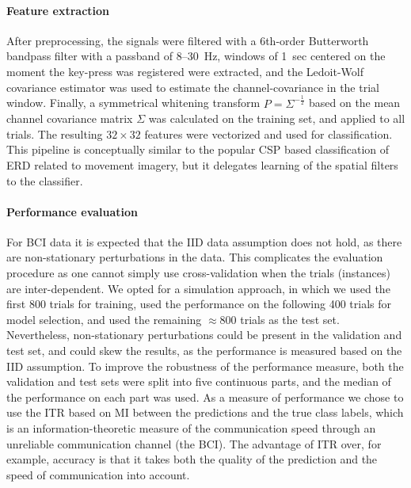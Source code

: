 \paragraph{Feature extraction}
After preprocessing, the signals were filtered with a 6th-order Butterworth
bandpass filter with a passband of 8--30~Hz, windows of 1~sec centered on the
moment the key-press was registered were extracted, and the Ledoit-Wolf
covariance estimator \cite{ledoit2004wce} was used to estimate the
channel-covariance in the trial window. Finally, a symmetrical whitening
transform $P = \Sigma^{-\frac{1}{2}}$ based on the mean channel covariance
matrix $\Sigma$ was calculated on the training set, and applied to all trials.
The resulting $32\times32$ features were vectorized and used for
classification. This pipeline is conceptually similar to the popular \ac{CSP}
based \cite{koles1991qet, ramoser2000osf} classification of \ac{ERD} related to
movement imagery, but it delegates learning of the spatial filters to the
classifier. 

\paragraph{Performance evaluation}
For \ac{BCI} data it is expected that the \ac{IID} data assumption does not
hold, as there are non-stationary perturbations in the data. This complicates
the evaluation procedure as one cannot simply use cross-validation when the
trials (instances) are inter-dependent. We opted for a simulation
approach, in which we used the first 800 trials for training, used the
performance on the following 400 trials for model selection, and used the
remaining $\approx 800$ trials as the test set. Nevertheless, non-stationary
perturbations could be present in the validation and test set, and could skew
the results, as the performance is measured based on the \ac{IID} assumption.
To improve the robustness of the performance measure, both the validation and
test sets were split into five continuous parts, and the median of the
performance on each part was used.
%
As a measure of performance we chose to use the \ac{ITR} based on \ac{MI}
between the predictions and the true class labels, which is an
information-theoretic measure of the communication speed through an unreliable
communication channel (the \ac{BCI}). The advantage of \ac{ITR} over, for
example, accuracy is that it takes both the quality of the prediction and the
speed of communication into account.

